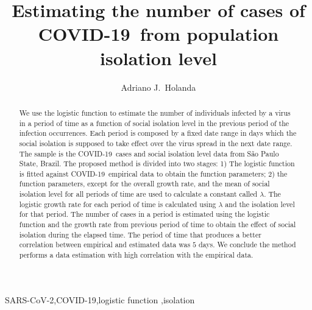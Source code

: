 \documentclass[review]{elsarticle}
\def\covid{\hbox{COVID-19}} %
\def\sarscov{{SARS-CoV-2}}
\begin{document}
\begin{frontmatter}

\title{Estimating the number of cases of \covid\ from population isolation level}

\author[mymainaddress,mysecondaryaddress]{Adriano J.\ Holanda}

\address[mymainaddress]{Department of Computing and Mathematics - Faculty of Philosophy, Science and Letters at Ribeir\~{a}o Preto - University of S\~{a}o Paulo, Ribeirão Preto, S\~{a}o Paulo, Brazil}
\address[mysecondaryaddress]{Faculty ``Dr.\ Francisco Maeda'', Ituverava, S\~{a}o Paulo, Brazil}


\begin{abstract}
We use the logistic function to estimate the number 
of individuals infected by a virus in a period of time
as a function of social isolation level 
in the previous period of the infection occurrences.
Each period is composed by a fixed date range in days 
which the social isolation is supposed to take
effect over the virus spread in the next 
date range.
The sample is the \covid\ cases and 
social isolation level data from S\~{a}o Paulo State, Brazil.  
The proposed method is divided into two stages: 
1) The logistic function is fitted against \covid\ 
empirical data to obtain the function parameters; 
2) the function parameters, 
 except for the overall growth rate,
 and the mean of social isolation level for all periods of time 
are used to calculate a constant called $\lambda$.
The logistic growth rate for each period of time
is calculated using $\lambda$ 
and the isolation level for that period.
 The number of cases in a period is estimated using 
the logistic function and the growth rate 
from previous period of time 
to obtain the effect of social isolation during the
elapsed time. 
The period of time that produces a 
better correlation between empirical and estimated 
data was $5$ days. 
We conclude the method performs a data estimation with  
 high correlation with the empirical data.
\end{abstract}

\begin{keyword}
\sarscov \sep \covid \sep logistic function \sep isolation
\end{keyword}

\end{frontmatter}
\end{document}
